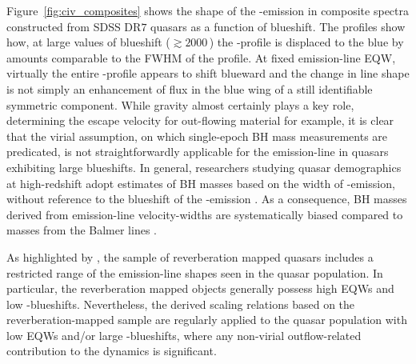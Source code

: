 Figure~\ref{fig:civ_composites} shows the shape of the -emission in composite spectra constructed from SDSS DR$7$ quasars as a function of  blueshift. 
The profiles show how, at large values of blueshift ($\gtrsim2000$\,\kms) the -profile is displaced to the blue by amounts comparable to the FWHM of the profile.
At fixed emission-line EQW, virtually the entire -profile appears to shift blueward and the change in line shape is not simply an enhancement of flux in the blue wing of a still identifiable symmetric component. 
While gravity almost certainly plays a key role, determining the escape velocity for out-flowing material for example, it is clear that the virial assumption, on which single-epoch BH mass measurements are predicated, is not straightforwardly applicable for the  emission-line in quasars exhibiting large blueshifts.
In general, researchers studying quasar demographics at high-redshift adopt estimates of BH masses based on the width of -emission, without reference to the blueshift of the -emission \citep[e.g.][]{vestergaard04,kollmeier06,gavignaud08,vestergaard08,vestergaard09,kelly10,kelly13}.  
As a consequence, BH masses derived from  emission-line velocity-widths are systematically biased compared to masses from the Balmer lines \citep[e.g.][]{shen08,shen12}. 

As highlighted by \citet{richards11}, the sample of reverberation mapped quasars includes a restricted range of the  emission-line shapes seen in the quasar population. 
In particular, the reverberation mapped objects generally possess high  EQWs and low -blueshifts. 
Nevertheless, the derived scaling relations based on the reverberation-mapped sample are regularly applied to the quasar population with low  EQWs and/or large -blueshifts, where any non-virial outflow-related contribution to the dynamics is significant. 


